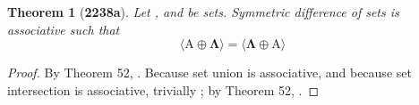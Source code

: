 \documentclass[preview]{standalone}
\newtheorem{theorem}{Theorem}
\begin{document}
\begin{theorem}[\textbf{2238a}]
    Let , and \bm{$\Lambda$} be sets. 
    Symmetric difference of sets is associative such that 
    \begin{equation*}
        \bm{
            \big \langle \mathrm{A} \oplus \Lambda \big \rangle
                = 
            \big \langle \Lambda \oplus \mathrm{A} \big \rangle
        }
    \end{equation*}
\end{theorem}
\begin{proof}
    By Theorem 52, 
    . 
    Because set union is associative, and because set intersection is associative,
    trivially 
    ;
    by Theorem 52, 
    .
\end{proof}
\end{document}

